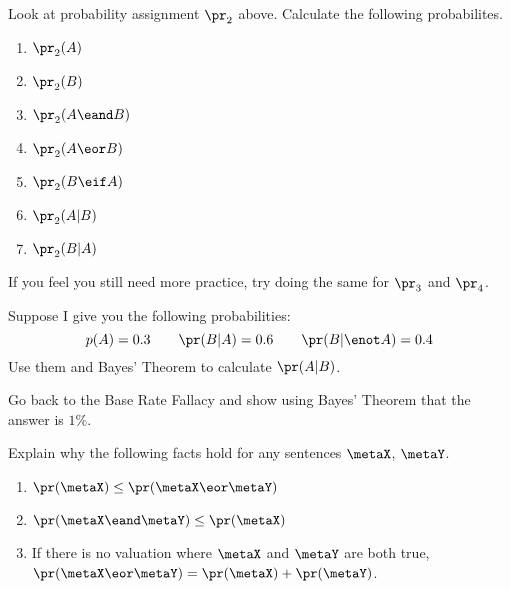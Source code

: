 \begin{practiceproblems}

\problempart Look at probability assignment $\pr_2$ above. Calculate the following probabilites.
\begin{enumerate}
\item $\pr_2(A)$
\item $\pr_2(B)$
\item $\pr_2(A\eand  B)$
\item $\pr_2(A \eor B)$
\item $\pr_2(B\eif A)$
\item $\pr_2(A | B)$
\item $\pr_2(B | A)$
\end{enumerate}
If you feel you still need more practice, try doing the same for $\pr_3$ and $\pr_4$.



\problempart Suppose I give you the following probabilities:
\[
p(A) = 0.3 \qquad \pr(B | A) = 0.6 \qquad \pr(B | \enot A) = 0.4
\]
Use them and Bayes' Theorem to calculate $\pr(A | B)$.

\problempart Go back to the Base Rate Fallacy and show using Bayes' Theorem that the answer is $1\%$.

\problempart Explain why the following facts hold for any sentences $\metaX$, $\metaY$.
\begin{enumerate}
\item $\pr(\metaX) \leq \pr(\metaX \eor \metaY)$
\item $\pr(\metaX\eand \metaY) \leq \pr(\metaX)$
\item If there is no valuation where $\metaX$ and $\metaY$ are both true, $\pr(\metaX \eor \metaY) = \pr(\metaX) + \pr(\metaY)$.
\end{enumerate}
\end{practiceproblems}
